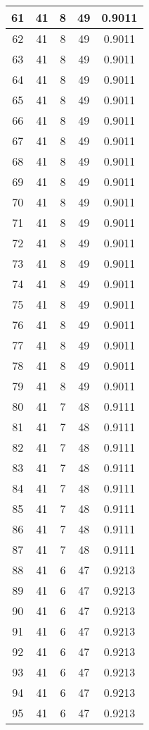 \documentclass[letterpaper, 12pt]{article}
\begin{document}
\begin{longtable}{|c|c|c|c|c|}
61 & 41 & 8 & 49 & 0.9011 \\
\hline
62 & 41 & 8 & 49 & 0.9011 \\
\hline
63 & 41 & 8 & 49 & 0.9011 \\
\hline
64 & 41 & 8 & 49 & 0.9011 \\
\hline
65 & 41 & 8 & 49 & 0.9011 \\
\hline
66 & 41 & 8 & 49 & 0.9011 \\
\hline
67 & 41 & 8 & 49 & 0.9011 \\
\hline
68 & 41 & 8 & 49 & 0.9011 \\
\hline
69 & 41 & 8 & 49 & 0.9011 \\
\hline
70 & 41 & 8 & 49 & 0.9011 \\
\hline
71 & 41 & 8 & 49 & 0.9011 \\
\hline
72 & 41 & 8 & 49 & 0.9011 \\
\hline
73 & 41 & 8 & 49 & 0.9011 \\
\hline
74 & 41 & 8 & 49 & 0.9011 \\
\hline
75 & 41 & 8 & 49 & 0.9011 \\
\hline
76 & 41 & 8 & 49 & 0.9011 \\
\hline
77 & 41 & 8 & 49 & 0.9011 \\
\hline
78 & 41 & 8 & 49 & 0.9011 \\
\hline
79 & 41 & 8 & 49 & 0.9011 \\
\hline
80 & 41 & 7 & 48 & 0.9111 \\
\hline
81 & 41 & 7 & 48 & 0.9111 \\
\hline
82 & 41 & 7 & 48 & 0.9111 \\
\hline
83 & 41 & 7 & 48 & 0.9111 \\
\hline
84 & 41 & 7 & 48 & 0.9111 \\
\hline
85 & 41 & 7 & 48 & 0.9111 \\
\hline
86 & 41 & 7 & 48 & 0.9111 \\
\hline
87 & 41 & 7 & 48 & 0.9111 \\
\hline
88 & 41 & 6 & 47 & 0.9213 \\
\hline
89 & 41 & 6 & 47 & 0.9213 \\
\hline
90 & 41 & 6 & 47 & 0.9213 \\
\hline
91 & 41 & 6 & 47 & 0.9213 \\
\hline
92 & 41 & 6 & 47 & 0.9213 \\
\hline
93 & 41 & 6 & 47 & 0.9213 \\
\hline
94 & 41 & 6 & 47 & 0.9213 \\
\hline
95 & 41 & 6 & 47 & 0.9213 \\

\end{longtable}
\end{document}
